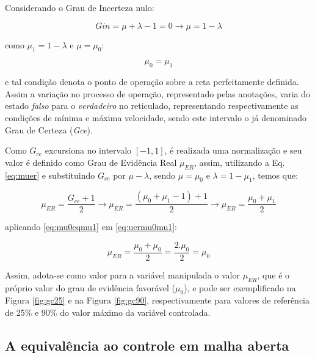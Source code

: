 


\vspace{3cm}

Considerando o Grau de Incerteza nulo:

\begin{equation}
Gin = \mu + \lambda - 1 = 0 \rightarrow \mu = 1 - \lambda
\end{equation}

como $\mu_1 = 1 - \lambda$ e $\mu = \mu_0$:

\begin{equation}
\mu_0 = \mu_1
\label{eq:mu0eqmu1}
\end{equation}

e tal condição denota o ponto de operação
sobre a reta perfeitamente definida.
Assim a variação no processo de operação,
representado pelas anotações,
varia do estado
\emph{falso} para o
\emph{verdadeiro} no reticulado,
representando respectivamente
as condições de mínima e máxima velocidade,
sendo este intervalo o já denominado
Grau de Certeza (\emph{Gce}).

Como \emph{$G_{ce}$} excursiona no intervalo $[-1,1]$,
é realizada uma normalização e seu valor é
definido como Grau de Evidência Real $\mu_{ER}$,
assim, utilizando a Eq. \ref{eq:muer} e
substituindo $G_{ce}$ por $\mu - \lambda$, sendo $\mu = \mu_0$ e $\lambda = 1 - \mu_1$, temos que:


\begin{equation}
\mu_{ER} = \frac{G_{ce} + 1}{2} \rightarrow \mu_{ER} = \frac{(\mu_0 + \mu_1 - 1) + 1}{2} \rightarrow \mu_{ER} = \frac{\mu_0 + \mu_1}{2}
\label{eq:uermu0mu1}
\end{equation}

aplicando \ref{eq:mu0eqmu1} em \ref{eq:uermu0mu1}:

\begin{equation}
\mu_{ER} = \frac{\mu_0 + \mu_0}{2} = \frac{2.\mu_0}{2} = \mu_0
\end{equation}


Assim, adota-se como valor para a variável manipulada 
o valor $\mu_{ER}$, que é o próprio valor do 
grau de evidência favorável ($\mu_0$), 
e pode ser exemplificado na 
Figura \ref{fig:gc25} e na 
Figura \ref{fig:gc90}, 
respectivamente para valores de referência de 25\% e 90\%
do valor máximo da variável controlada.


\subsection{A equivalência ao controle em malha aberta}

